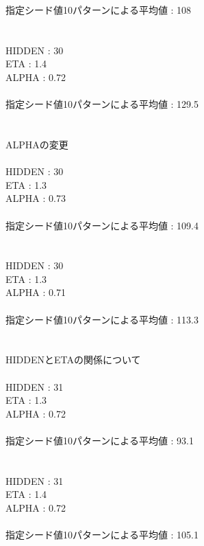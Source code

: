 指定シード値10パターンによる平均値 : 108\\


\\\\
HIDDEN : 30\\
ETA        : 1.4\\
ALPHA   : 0.72\\\\

指定シード値10パターンによる平均値 : 129.5\\


\\\\
ALPHAの変更\\\\
HIDDEN : 30\\
ETA        : 1.3\\
ALPHA   : 0.73\\\\

指定シード値10パターンによる平均値 : 109.4\\


\\\\
HIDDEN : 30\\
ETA        : 1.3\\
ALPHA   : 0.71\\\\

指定シード値10パターンによる平均値 : 113.3\\


\\\\
HIDDENとETAの関係について\\\\
HIDDEN : 31\\
ETA        : 1.3\\
ALPHA   : 0.72\\\\

指定シード値10パターンによる平均値 : 93.1\\


\\\\
HIDDEN : 31\\
ETA        : 1.4\\
ALPHA   : 0.72\\\\

指定シード値10パターンによる平均値 : 105.1\\


